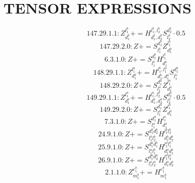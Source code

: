 \documentclass[letterpaper,10pt,fleqn,leqno,onecolumn]{article}
\begin{document}
\section{TENSOR EXPRESSIONS}
\begin{equation} \;\;\;\;\;\;  147.29.1.1: Z^{l_{1}^{b}}_{d_{1}^{b}}+=H^{l_{1}^{b},l_{2}^{b}}_{d_{1}^{b},d_{2}^{b}}S^{d_{2}^{b}}_{l_{2}^{b}}\cdot 0.5 \end{equation}
\begin{equation} \;\;\;\;\;\;  147.29.2.0: Z+=S^{d_{1}^{b}}_{l_{1}^{b}}Z^{l_{1}^{b}}_{d_{1}^{b}} \end{equation}
\begin{equation} \;\;\;\;\;\;  6.3.1.0: Z+=S^{d_{1}^{b}}_{l_{1}^{b}}H^{l_{1}^{b}}_{d_{1}^{b}} \end{equation}
\begin{equation} \;\;\;\;\;\;  148.29.1.1: Z^{l_{1}^{a}}_{d_{1}^{a}}+=H^{l_{1}^{b},l_{1}^{a}}_{d_{1}^{b},d_{1}^{a}}S^{d_{1}^{b}}_{l_{1}^{b}} \end{equation}
\begin{equation} \;\;\;\;\;\;  148.29.2.0: Z+=S^{d_{1}^{a}}_{l_{1}^{a}}Z^{l_{1}^{a}}_{d_{1}^{a}} \end{equation}
\begin{equation} \;\;\;\;\;\;  149.29.1.1: Z^{l_{1}^{a}}_{d_{1}^{a}}+=H^{l_{1}^{a},l_{2}^{a}}_{d_{1}^{a},d_{2}^{a}}S^{d_{2}^{a}}_{l_{2}^{a}}\cdot 0.5 \end{equation}
\begin{equation} \;\;\;\;\;\;  149.29.2.0: Z+=S^{d_{1}^{a}}_{l_{1}^{a}}Z^{l_{1}^{a}}_{d_{1}^{a}} \end{equation}
\begin{equation} \;\;\;\;\;\;  7.3.1.0: Z+=S^{d_{1}^{a}}_{l_{1}^{a}}H^{l_{1}^{a}}_{d_{1}^{a}} \end{equation}
\begin{equation} \;\;\;\;\;\;  24.9.1.0: Z+=S^{d_{1}^{b}d_{2}^{b}}_{l_{1}^{b}l_{2}^{b}}H^{l_{1}^{b}l_{2}^{b}}_{d_{1}^{b}d_{2}^{b}} \end{equation}
\begin{equation} \;\;\;\;\;\;  25.9.1.0: Z+=S^{d_{1}^{a}d_{1}^{b}}_{l_{1}^{a}l_{1}^{b}}H^{l_{1}^{a}l_{1}^{b}}_{d_{1}^{a}d_{1}^{b}} \end{equation}
\begin{equation} \;\;\;\;\;\;  26.9.1.0: Z+=S^{d_{1}^{a}d_{2}^{a}}_{l_{1}^{a}l_{2}^{a}}H^{l_{1}^{a}l_{2}^{a}}_{d_{1}^{a}d_{2}^{a}} \end{equation}
\begin{equation} \;\;\;\;\;\;  2.1.1.0: Z^{e_{1}^{b}}_{m_{1}^{b}}+=H^{e_{1}^{b}}_{m_{1}^{b}} \end{equation}
\end{document}
